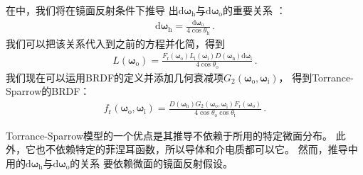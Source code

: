 在中，我们将在镜面反射条件下推导
出$\mathrm{d}{\bm\omega}_{\mathrm{h}}$与$\mathrm{d}{\bm\omega}_{\mathrm{o}}$的重要关系
：
\begin{align}\label{eq:8.17}
    \mathrm{d}{\bm\omega}_{\mathrm{h}}=\frac{\mathrm{d}{\bm\omega}_{\mathrm{o}}}{4\cos\theta_{\mathrm{h}}}\, .
\end{align}
我们可以把该关系代入到之前的方程并化简，得到
\begin{align*}
    L({\bm\omega}_{\mathrm{o}})=\frac{F_{\mathrm{r}}({\bm\omega}_{\mathrm{o}})
    L_{\mathrm{i}}({\bm\omega}_{\mathrm{i}})D({\bm\omega}_{\mathrm{h}})\mathrm{d}{\bm\omega}_{\mathrm{i}}}
    {4\cos\theta_{\mathrm{o}}}\, .
\end{align*}
我们现在可以运用BRDF的定义并添加几何衰减项$G_2({\bm\omega}_{\mathrm{o}},{\bm\omega}_{\mathrm{i}})$，
得到Torrance-Sparrow的BRDF：
\begin{align}\label{eq:8.18}
    f_{\mathrm{r}}({\bm\omega}_{\mathrm{o}},{\bm\omega}_{\mathrm{i}})=
    \frac{D({\bm\omega}_{\mathrm{h}})G_2({\bm\omega}_{\mathrm{o}},{\bm\omega}_{\mathrm{i}})
    F_{\mathrm{r}}({\bm\omega}_{\mathrm{o}})}{4\cos\theta_{\mathrm{o}}\cos\theta_{\mathrm{i}}}\, .
\end{align}

Torrance-Sparrow模型的一个优点是其推导不依赖于所用的特定微面分布。
此外，它也不依赖特定的菲涅耳函数，所以导体和介电质都可以它。
然而，推导中用的$\mathrm{d}{\bm\omega}_{\mathrm{h}}$与$\mathrm{d}{\bm\omega}_{\mathrm{o}}$的关系
要依赖微面的镜面反射假设。

